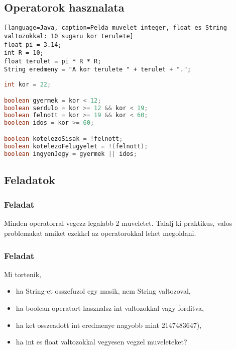 \documentclass{article}
\begin{document}
\newpage

\subsection{Operatorok hasznalata}

\begin{lstlisting}[language=Java, caption=Pelda muvelet integer, float es String valtozokkal: 10 sugaru kor terulete]
float pi = 3.14;
int R = 10;
float terulet = pi * R * R;
String eredmeny = "A kor terulete " + terulet + ".";
\end{lstlisting}

\begin{lstlisting}[language=Java, caption=Pelda muvelet boolean valtozokkal (kalandpark)]
int kor = 22;

boolean gyermek = kor < 12;
boolean serdulo = kor >= 12 && kor < 19;
boolean felnott = kor >= 19 && kor < 60;
boolean idos = kor >= 60;

boolean kotelezoSisak = !felnott;
boolean kotelezoFelugyelet = !(felnott);
boolean ingyenJegy = gyermek || idos;

\end{lstlisting}

\subsection{Feladatok}

\subsubsection{Feladat}

Minden operatorral vegezz legalabb 2 muveletet. Talalj ki praktikus, valos problemakat amiket ezekkel az operatorokkal lehet megoldani.

\subsubsection{Feladat}

Mi tortenik,
\begin{itemize}
    \item ha String-et osszefuzol egy masik, nem String valtozoval,
    \item ha boolean operatort hasznalsz int valtozokkal vagy forditva,
    \item ha ket osszeadott int eredmenye nagyobb mint 2147483647),
    \item ha int es float valtozokkal vegyesen vegzel muveleteket?
\end{itemize}
\end{document}
